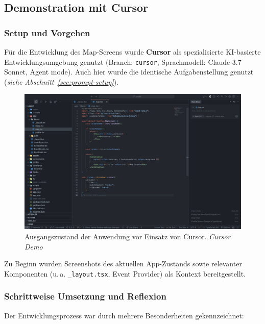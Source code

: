 \subsection{Demonstration mit Cursor}

\subsubsection{Setup und Vorgehen}
Für die Entwicklung des Map-Screens wurde \textbf{Cursor} als spezialisierte
KI-basierte Entwicklungsumgebung genutzt (Branch: \texttt{cursor},
Sprachmodell: Claude 3.7 Sonnet, Agent mode). Auch hier wurde die identische
Aufgabenstellung genutzt (\emph{siehe Abschnitt~\ref{sec:prompt-setup}}).

\begin{figure}[htbp]
      \centering
      \includegraphics[width=1\textwidth]{images/cursor_screenshots/Screenshots Ist-Zustand-cursor.png}
      \caption{Ausgangszustand der Anwendung vor Einsatz von Cursor. \textit{Cursor Demo}}
      \label{fig:cursor-istzustand}
\end{figure}

Zu Beginn wurden Screenshots des aktuellen App-Zustands sowie relevanter
Komponenten (u.\,a. \texttt{\_layout.tsx}, Event Provider) als Kontext
bereitgestellt.

\subsubsection{Schrittweise Umsetzung und Reflexion}

Der Entwicklungsprozess war durch mehrere Besonderheiten gekennzeichnet:

